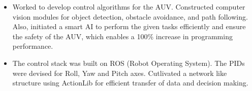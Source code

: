 \begin{itemize}
    \item Worked to develop control algorithms for the AUV. Constructed computer vision modules for object detection, obstacle avoidance, and path following. Also, initiated a smart AI to perform the given tasks efficiently and ensure the safety of the AUV, which enables a 100\% increase in programming performance.
    \item The control stack was built on ROS (Robot Operating System). The PIDs were devised for Roll, Yaw and Pitch axes. Cutlivated a network like structure using ActionLib for efficient transfer of data and decision making.
\end{itemize}
